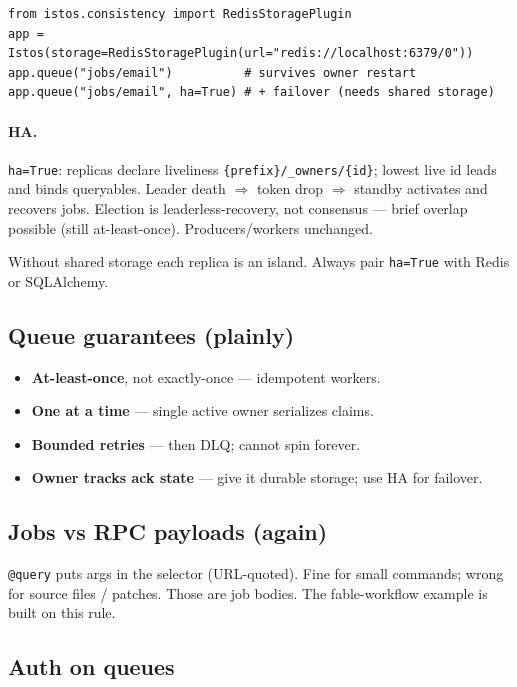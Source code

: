 \documentclass[11pt,a4paper]{article}
\begin{document}
\begin{lstlisting}
from istos.consistency import RedisStoragePlugin
app = Istos(storage=RedisStoragePlugin(url="redis://localhost:6379/0"))
app.queue("jobs/email")          # survives owner restart
app.queue("jobs/email", ha=True) # + failover (needs shared storage)
\end{lstlisting}

\paragraph{HA.} \texttt{ha=True}: replicas declare liveliness
\texttt{\{prefix\}/\_owners/\{id\}}; lowest live id leads and binds queryables.
Leader death $\Rightarrow$ token drop $\Rightarrow$ standby activates and recovers
jobs. Election is leaderless-recovery, not consensus --- brief overlap possible
(still at-least-once). Producers/workers unchanged.

\begin{warnbox}[HA + in-memory = false HA]
Without shared storage each replica is an island. Always pair \texttt{ha=True}
with Redis or SQLAlchemy.
\end{warnbox}

\subsection{Queue guarantees (plainly)}

\begin{itemize}[leftmargin=*]
  \item \textbf{At-least-once}, not exactly-once --- idempotent workers.
  \item \textbf{One at a time} --- single active owner serializes claims.
  \item \textbf{Bounded retries} --- then DLQ; cannot spin forever.
  \item \textbf{Owner tracks ack state} --- give it durable storage; use HA for
        failover.
\end{itemize}

\subsection{Jobs vs RPC payloads (again)}

\texttt{@query} puts args in the selector (URL-quoted). Fine for small commands;
wrong for source files / patches. Those are job bodies. The fable-workflow example
is built on this rule.

\subsection{Auth on queues}
\end{document}
